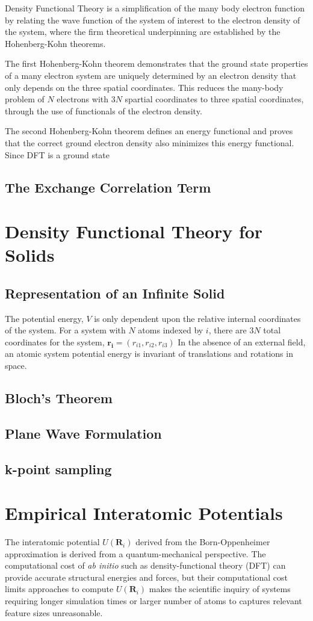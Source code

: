 Density Functional Theory is a simplification of the many body electron function by relating the wave function of the system of interest to the electron density of the system, where the firm theoretical underpinning are established by the Hohenberg-Kohn theorems\cite{hohenberg1964_dft}.

The first Hohenberg-Kohn theorem demonstrates that the ground state properties of a many electron system are uniquely determined by an electron density that only depends on the three spatial coordinates.  This reduces the many-body problem of $N$ electrons with $3N$ spartial coordinates to three spatial coordinates, through the use of functionals of the electron density.  

The second Hohenberg-Kohn theorem defines an energy functional and proves that the correct ground electron density also minimizes this energy functional.  Since DFT is a ground state
\subsection{The Exchange Correlation Term}
\section{Density Functional Theory for Solids}
\subsection{Representation of an Infinite Solid}

The potential energy, $V$ is only dependent upon the relative internal coordinates of the system.  
For a system with $N$ atoms indexed by $i$, there are $3N$ total coordinates for the system,
	$\bm{r_{i}}=(r_{i1},r_{i2},r_{i3})$
In the absence of an external field, an atomic system potential energy is invariant of translations and rotations in space.

\subsection{Bloch's Theorem}
\subsection{Plane Wave Formulation}
\subsection{k-point sampling}
\section{Empirical Interatomic Potentials}
The interatomic potential $U(\bm{R}_i)$ derived from the Born-Oppenheimer approximation is derived from a quantum-mechanical perspective.  The computational cost of \emph{ab initio} such as density-functional theory (DFT) can provide accurate structural energies and forces, but their computational cost limits approaches to compute $U(\bm{R}_i)$ makes the scientific inquiry of systems requiring longer simulation times or larger number of atoms to captures relevant feature sizes unreasonable.

